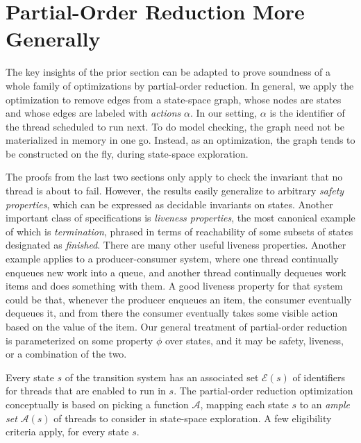 \documentclass{amsbook}
\theoremstyle{definition}
\theoremstyle{remark}
\numberwithin{section}{chapter}
\numberwithin{equation}{chapter}
\begin{document}
\section{Partial-Order Reduction More Generally}

The key insights of the prior section can be adapted to prove soundness of a whole family of optimizations by partial-order reduction.
In general, we apply the optimization to remove edges from a state-space graph, whose nodes are states and whose edges are labeled with \emph{actions} $\alpha$.
In our setting, $\alpha$ is the identifier of the thread scheduled to run next.
To do model checking, the graph need not be materialized in memory in one go.
Instead, as an optimization, the graph tends to be constructed on the fly, during state-space exploration.

The proofs from the last two sections only apply to check the invariant that no thread is about to fail.
However, the results easily generalize to arbitrary \emph{safety properties}, which can be expressed as decidable invariants on states.
Another important class of specifications is \emph{liveness properties}, the most canonical example of which is \emph{termination}, phrased in terms of reachability of some subsets of states designated as \emph{finished}.
There are many other useful liveness properties.
Another example applies to a producer-consumer system, where one thread continually enqueues new work into a queue, and another thread continually dequeues work items and does something with them.
A good liveness property for that system could be that, whenever the producer enqueues an item, the consumer eventually dequeues it, and from there the consumer eventually takes some visible action based on the value of the item.
Our general treatment of partial-order reduction is parameterized on some property $\phi$ over states, and it may be safety, liveness, or a combination of the two.

Every state $s$ of the transition system has an associated set $\mathcal E(s)$ of identifiers for threads that are enabled to run in $s$.
The partial-order reduction optimization conceptually is based on picking a function $\mathcal A$, mapping each state $s$ to an \emph{ample set} $\mathcal A(s)$ of threads to consider in state-space exploration.
A few eligibility criteria apply, for every state $s$.
\end{document}
